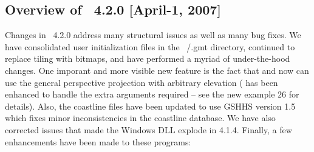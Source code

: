 
\subsection{Overview of \gmt\ 4.2.0 [April-1, 2007]}

Changes in \GMT\ 4.2.0 address many structural issues as well as many bug fixes.  We have consolidated
user initialization files in the ~/.gmt directory, continued to replace tiling with bitmaps,
and have performed a myriad of under-the-hood changes. One imporant and more visible
new feature is the fact that  and  now can use the general perspective
projection with arbitrary elevation ( has been enhanced to handle the extra arguments required
-- see the new example 26 for details).
Also, the coastline files have been updated to use GSHHS version 1.5 which fixes minor inconsistencies
in the coastline database.  We have also corrected issues that made the Windows DLL explode in 4.1.4.
Finally, a few enhancements have been made to these programs:

